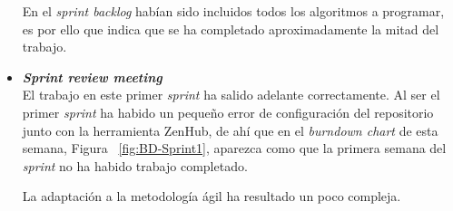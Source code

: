 \begin{itemize}
En el \textit{sprint backlog} habían sido incluidos todos los algoritmos a programar, es por ello que indica que se ha completado aproximadamente la mitad del trabajo.

\item \textbf{\textit{Sprint review meeting}}\\
El trabajo en este primer \textit{sprint} ha salido adelante correctamente. Al ser el primer \textit{sprint} ha habido un pequeño error de configuración del repositorio junto con la herramienta ZenHub, de ahí que en el \textit{burndown chart} de esta semana, Figura ~\ref{fig:BD-Sprint1}, aparezca como que la primera semana del \textit{sprint} no ha habido trabajo completado.

La adaptación a la metodología ágil ha resultado un poco compleja.
\end{itemize}

